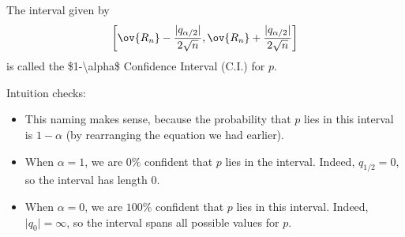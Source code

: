 \begin{definition}

The interval given by 
\[\left[\ov{R_n} - \frac{\vert q_{\alpha/2}\vert}{2\sqrt{n}}, \ov{R_n} + \frac{\vert q_{\alpha/2}\vert}{2\sqrt{n}}\right]\]
is called the \ac{$1-\alpha$ Confidence Interval} (C.I.) for $p$. 
\end{definition}

Intuition checks:
\begin{itemize}
\setlength \itemsep{0cm}
    \item This naming makes sense, because the probability that $p$ lies in this interval is $1-\alpha$ (by rearranging the equation we had earlier). 
    \item When $\alpha=1$, we are $0\%$ confident that $p$ lies in the interval. Indeed, $q_{1/2} = 0$, so the interval has length $0$.
    \item When $\alpha=0$, we are $100\%$ confident that $p$ lies in this interval. Indeed, $\vert q_{0}\vert = \infty$, so the interval spans all possible values for $p$.
\end{itemize}